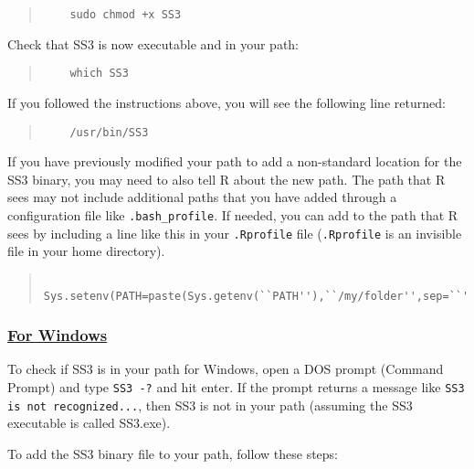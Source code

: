\begin{quote}
   \begin{verbatim}
    sudo chmod +x SS3
    \end{verbatim}
\end{quote}

Check that SS3 is now executable and in your path:

\begin{quote}
   \begin{verbatim}
    which SS3
    \end{verbatim}
\end{quote}

If you followed the instructions above, you will see the following line returned:

\begin{quote}
   \begin{verbatim}
    /usr/bin/SS3
  \end{verbatim}
\end{quote}

If you have previously modified your path to add a non-standard location for the SS3 binary, you may need to also tell R about the new path. The path that R sees may not include additional paths that you have added through a configuration file like \texttt{.bash\_profile}. If needed, you can add to the path that R sees by including a line like this in your \texttt{.Rprofile} file (\texttt{.Rprofile} is an invisible file in your home directory).

\begin{quote}
   \begin{verbatim}
    Sys.setenv(PATH=paste(Sys.getenv(``PATH''),``/my/folder'',sep=``'':''))
    \end{verbatim}
\end{quote}

\hypertarget{Windows}{}
\subsubsection[For Windows]{\protect\hyperlink{Windows}{For Windows}}
To check if SS3 is in your path for Windows, open a DOS prompt (Command Prompt) and type \texttt{SS3 -?} and hit enter. If the prompt returns a message like \texttt{SS3 is not recognized...}, then SS3 is not in your path (assuming the SS3 executable is called SS3.exe).

To add the SS3 binary file to your path, follow these steps:

